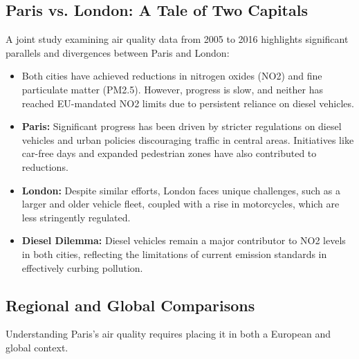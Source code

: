 \documentclass{modeleRapport}
\begin{document}
\subsection{Paris vs. London: A Tale of Two Capitals}

A joint study examining air quality data from 2005 to 2016 highlights significant parallels and divergences 
between Paris and London:\\

\begin{itemize}
    \item Both cities have achieved reductions in nitrogen oxides (NO2) and fine particulate matter (PM2.5). 
    However, progress is slow, and neither has reached EU-mandated NO2 limits due to persistent reliance on diesel vehicles.
    \item \textbf{Paris:} Significant progress has been driven by stricter regulations on diesel vehicles and urban policies 
    discouraging traffic in central areas. Initiatives like car-free days and expanded pedestrian zones have also contributed 
    to reductions.
    \item \textbf{London:} Despite similar efforts, London faces unique challenges, such as a larger and older vehicle fleet, 
    coupled with a rise in motorcycles, which are less stringently regulated.
    \item \textbf{Diesel Dilemma:} Diesel vehicles remain a major contributor to NO2 levels in both cities, reflecting the 
    limitations of current emission standards in effectively curbing pollution.
\end{itemize}

\subsection{Regional and Global Comparisons}

Understanding Paris’s air quality requires placing it in both a European and global context.\\
\end{document}
